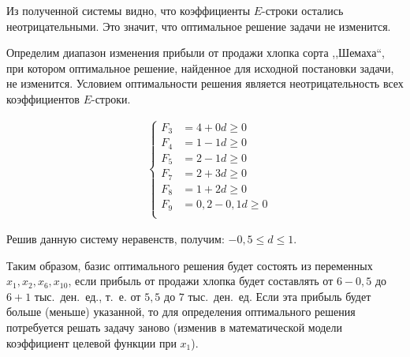 Из полученной системы видно, что коэффициенты $ E $-строки остались неотрицательными. Это значит, что оптимальное решение задачи не изменится.

Определим диапазон изменения прибыли от продажи хлопка сорта ,,Шемаха``, при котором оптимальное решение, найденное для исходной постановки задачи, не изменится. Условием оптимальности решения является неотрицательность всех коэффициентов $E$-строки. \par
\begin{equation}
	\begin{aligned}
  	&\left\{
    	\begin{aligned}
	      F_3 & = 4 + 0d \ge 0 \\
	      F_4 & = 1 - 1d \ge 0 \\
	      F_5 & = 2 - 1d \ge 0 \\
	      F_7 & = 2 + 3d \ge 0 \\
	      F_8 & = 1 + 2d \ge 0 \\
	      F_9 & = 0,2 - 0,1d \ge 0 \\
    	\end{aligned}
  	\right.
	\end{aligned}
\end{equation}

Решив данную систему неравенств, получим: $ -0,5 \le d \le 1 $.

Таким образом, базис оптимального решения будет состоять из переменных $ x_1, x_2, x_6, x_{10} $, если прибыль от продажи хлопка будет составлять от $6-0,5$ до $6+1$ тыс.~ден.~ед., т.~е. от $5,5$ до $7$ тыс.~ден.~ед. Если эта прибыль будет больше (меньше) указанной, то для определения оптимального решения потребуется решать задачу заново (изменив в математической модели коэффициент целевой функции при $ x_1 $).

\pagebreak